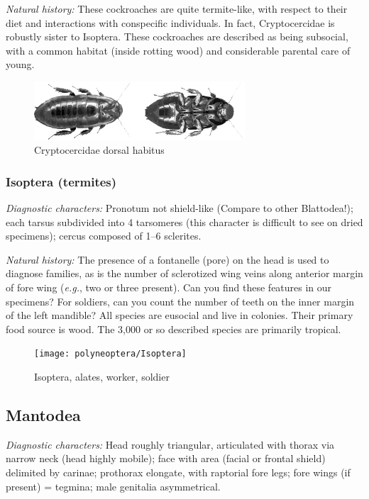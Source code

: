 \noindent{}\textit{Natural history:} These cockroaches are quite termite-like, with respect to their diet and interactions with conspecific individuals. In fact, Cryptocercidae is robustly sister to Isoptera. These cockroaches are described as being subsocial, with a common habitat (inside rotting wood) and considerable parental care of young.\vspace{3mm}

\begin{figure}[ht!]
  \centering
    \includegraphics[width=0.7\textwidth]{sections/img/polyneoptera/cryptocercids.pdf}
  \caption{Cryptocercidae dorsal habitus \citep[modified from][Fig. 4f1,f2]{BaiCryptocercid}}
  \label{fig:cryptocercid}
\end{figure}

\subsubsection{Isoptera (termites)}
\noindent{}\textit{Diagnostic characters:} Pronotum not shield-like (Compare to other Blattodea!); each tarsus subdivided into 4 tarsomeres (this character is difficult to see on dried specimens); cercus composed of 1--6 sclerites.\vspace{3mm}

\noindent{}\textit{Natural history:} The presence of a fontanelle (pore) on the head is used to diagnose families, as is the number of sclerotized wing veins along anterior margin of fore wing (\textit{e.g.}, two or three present). Can you find these features in our specimens? For soldiers, can you count the number of teeth on the inner margin of the left mandible? All species are eusocial and live in colonies. Their primary food source is wood. The 3,000 or so described species are primarily tropical.\vspace{3mm}

\begin{figure}[ht!]
  \centering
    \texttt{[image: polyneoptera/Isoptera]}
  \caption{Isoptera, alates, worker, soldier \citep[modified from][Plate II]{bhlitem82061AustrInsect}}
  \label{fig:termite}
\end{figure}

\subsection{Mantodea}
\noindent{}\textit{Diagnostic characters:} Head roughly triangular, articulated with thorax via narrow neck (head highly mobile); face with area (facial or frontal shield) delimited by carinae; prothorax elongate, with raptorial fore legs; fore wings (if present) = tegmina; male genitalia asymmetrical.\vspace{3mm}

